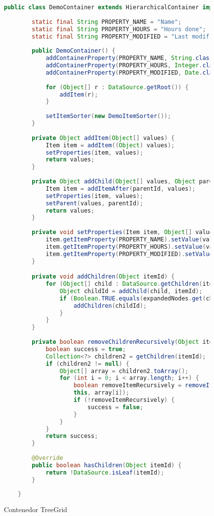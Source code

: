 \begin{figure}[!tb]
	\centering
	\begin{lstlisting}[language=Java]
	public class DemoContainer extends HierarchicalContainer implements Collapsible, Measurable {
	
		static final String PROPERTY_NAME = "Name";
		static final String PROPERTY_HOURS = "Hours done";
		static final String PROPERTY_MODIFIED = "Last modified";
		
		public DemoContainer() {
			addContainerProperty(PROPERTY_NAME, String.class, "");
			addContainerProperty(PROPERTY_HOURS, Integer.class, 0);
			addContainerProperty(PROPERTY_MODIFIED, Date.class, new Date());
			
			for (Object[] r : DataSource.getRoot()) {
				addItem(r);
			}
			
			setItemSorter(new DemoItemSorter());
		}
		
		private Object addItem(Object[] values) {
			Item item = addItem((Object) values);
			setProperties(item, values);
			return values;
		}
		
		private Object addChild(Object[] values, Object parentId) {
			Item item = addItemAfter(parentId, values);
			setProperties(item, values);
			setParent(values, parentId);
			return values;
		}
		
		private void setProperties(Item item, Object[] values) {
			item.getItemProperty(PROPERTY_NAME).setValue(values[0]);
			item.getItemProperty(PROPERTY_HOURS).setValue(values[1]);
			item.getItemProperty(PROPERTY_MODIFIED).setValue(values[2]);
		}

		private void addChildren(Object itemId) {
			for (Object[] child : DataSource.getChildren(itemId)) {
				Object childId = addChild(child, itemId);
				if (Boolean.TRUE.equals(expandedNodes.get(childId))) {
					addChildren(childId);
				}
			}
		}
		
		private boolean removeChildrenRecursively(Object itemId) {
			boolean success = true;
			Collection<?> children2 = getChildren(itemId);
			if (children2 != null) {
				Object[] array = children2.toArray();
				for (int i = 0; i < array.length; i++) {
					boolean removeItemRecursively = removeItemRecursively(
					this, array[i]);
					if (!removeItemRecursively) {
						success = false;
					}
				}
			}
			return success;	
		}
		
		@Override
		public boolean hasChildren(Object itemId) {
			return !DataSource.isLeaf(itemId);
		}
		
	}
	\end{lstlisting}
	\caption{Contenedor TreeGrid}
	\label{fig:demoContainer}
\end{figure}


